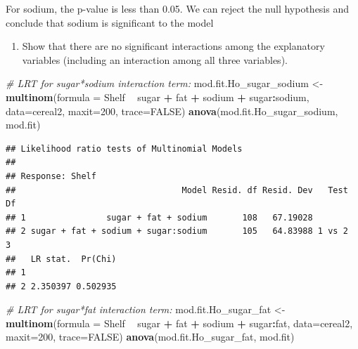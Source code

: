 \documentclass[11pt,]{article}
\newenvironment{Shaded}{\begin{snugshade}}{\end{snugshade}}
\newcommand{\KeywordTok}[1]{\textcolor[rgb]{0.13,0.29,0.53}{\textbf{#1}}}
\newcommand{\DataTypeTok}[1]{\textcolor[rgb]{0.13,0.29,0.53}{#1}}
\newcommand{\DecValTok}[1]{\textcolor[rgb]{0.00,0.00,0.81}{#1}}
\newcommand{\StringTok}[1]{\textcolor[rgb]{0.31,0.60,0.02}{#1}}
\newcommand{\CommentTok}[1]{\textcolor[rgb]{0.56,0.35,0.01}{\textit{#1}}}
\newcommand{\OtherTok}[1]{\textcolor[rgb]{0.56,0.35,0.01}{#1}}
\newcommand{\OperatorTok}[1]{\textcolor[rgb]{0.81,0.36,0.00}{\textbf{#1}}}
\newcommand{\NormalTok}[1]{#1}
\providecommand{\tightlist}{%
  \setlength{\itemsep}{0pt}\setlength{\parskip}{0pt}}
\begin{document}
For sodium, the p-value is less than 0.05. We can reject the null
hypothesis and conclude that sodium is significant to the model

\newpage

\begin{enumerate}
\def\labelenumi{\alph{enumi}.}
\setcounter{enumi}{4}
\tightlist
\item
  Show that there are no significant interactions among the explanatory
  variables (including an interaction among all three variables).
\end{enumerate}

\begin{Shaded}
\begin{Highlighting}[]
\CommentTok{# LRT for sugar*sodium interaction term:}
\NormalTok{mod.fit.Ho_sugar_sodium <-}\StringTok{ }\KeywordTok{multinom}\NormalTok{(}\DataTypeTok{formula =}\NormalTok{ Shelf }\OperatorTok{~}\StringTok{ }\NormalTok{sugar }\OperatorTok{+}\StringTok{ }\NormalTok{fat }\OperatorTok{+}\StringTok{ }\NormalTok{sodium }\OperatorTok{+}\StringTok{ }\NormalTok{sugar}\OperatorTok{:}\NormalTok{sodium, }\DataTypeTok{data=}\NormalTok{cereal2, }\DataTypeTok{maxit=}\DecValTok{200}\NormalTok{, }\DataTypeTok{trace=}\OtherTok{FALSE}\NormalTok{)}
\KeywordTok{anova}\NormalTok{(mod.fit.Ho_sugar_sodium, mod.fit)   }
\end{Highlighting}
\end{Shaded}

\begin{verbatim}
## Likelihood ratio tests of Multinomial Models
## 
## Response: Shelf
##                                 Model Resid. df Resid. Dev   Test    Df
## 1                sugar + fat + sodium       108   67.19028             
## 2 sugar + fat + sodium + sugar:sodium       105   64.83988 1 vs 2     3
##   LR stat.  Pr(Chi)
## 1                  
## 2 2.350397 0.502935
\end{verbatim}

\begin{Shaded}
\begin{Highlighting}[]
\CommentTok{# LRT for sugar*fat interaction term:}
\NormalTok{mod.fit.Ho_sugar_fat <-}\StringTok{ }\KeywordTok{multinom}\NormalTok{(}\DataTypeTok{formula =}\NormalTok{ Shelf }\OperatorTok{~}\StringTok{ }\NormalTok{sugar }\OperatorTok{+}\StringTok{ }\NormalTok{fat }\OperatorTok{+}\StringTok{ }\NormalTok{sodium }\OperatorTok{+}\StringTok{ }\NormalTok{sugar}\OperatorTok{:}\NormalTok{fat, }\DataTypeTok{data=}\NormalTok{cereal2, }\DataTypeTok{maxit=}\DecValTok{200}\NormalTok{, }\DataTypeTok{trace=}\OtherTok{FALSE}\NormalTok{)}
\KeywordTok{anova}\NormalTok{(mod.fit.Ho_sugar_fat, mod.fit)  }
\end{Highlighting}
\end{Shaded}
\end{document}
